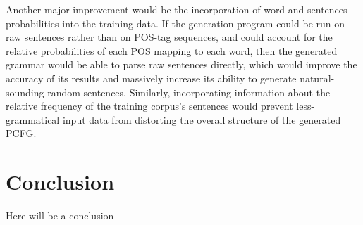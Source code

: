 \documentclass[paper=a4, fontsize=11pt]{scrartcl} %
\numberwithin{equation}{section} %
\numberwithin{figure}{section} %
\numberwithin{table}{section} %
\begin{document}
Another major improvement would be the incorporation of word and sentences probabilities into the training data. If the generation program could be run on raw sentences rather than on POS-tag sequences, and could account for the relative probabilities of each POS mapping to each word, then the generated grammar would be able to parse raw sentences directly, which would improve the accuracy of its results and massively increase its ability to generate natural-sounding random sentences. Similarly, incorporating information about the relative frequency of the training corpus's sentences would prevent less-grammatical input data from distorting the overall structure of the generated PCFG.

\section{Conclusion}

Here will be a conclusion
\end{document}
